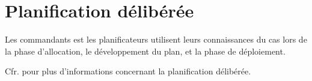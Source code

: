 \section{Planification délibérée}

Les commandants est les planificateurs utilisent leurs connaissances du \gls{cas} lors de la phase d'allocation, le développement du plan, et la phase de déploiement.

Cfr.  pour plus d'informations concernant la planification délibérée.